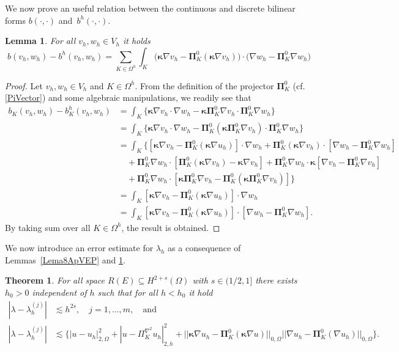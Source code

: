 \documentclass[final,reqno]{elsarticle}
\newtheorem{lemma}{Lemma}[section]
\newtheorem{theorem}{Theorem}[section]
\def\l{\lambda}
\def\bkappa{\boldsymbol{\kappa}}
\def\bPi{\mathbf{\Pi}}
\begin{document}
We now prove an useful relation between the continuous and discrete bilinear forms $b(\cdot,\cdot)$ and~$b^h(\cdot,\cdot)$.
\begin{lemma}\label{LemAuxiliar}
    For all $v_h,w_h\in V_h$ it holds
    \begin{equation*}
        b(v_h,w_h)-b^h(v_h,w_h)=\sum\limits_{K\in \Omega^h} \int_K \Big(\bkappa \nabla v_h-\bPi_K^0(\bkappa \nabla v_h) \Big)\cdot\Big( \nabla w_h - \bPi_K^0 \nabla w_h \Big) 
    \end{equation*}
\end{lemma}
\begin{proof}
Let  $v_h,w_h\in V_h$ and  $K\in \Omega^h$. From the definition of the projector $\bPi_K^0$ (cf. \eqref{PiVector}) and some algebraic manipulations, we readily see that
\begin{align*}
b_K(v_h,w_h)-b_K^h(v_h,w_h)
& =\int_K  \Big\{ \bkappa \nabla v_h\cdot \nabla w_h - \bkappa \bPi_K^0 \nabla v_h \cdot \bPi_K^0 \nabla w_h  \Big\}  \\
&=\int_K  \Big\{ \bkappa \nabla v_h\cdot \nabla w_h - \bPi_K^0(\bkappa \bPi_K^0 \nabla v_h) \cdot  \bPi_K^0 \nabla w_h  \Big\}\nonumber\\
&=\int_K \Big\{ [\bkappa \nabla v_h - \bPi_K^0(\bkappa \nabla u_h) ]\cdot \nabla w_h + \bPi_K^0(\bkappa \nabla v_h )\cdot [\nabla w_h-\bPi_K^0 \nabla w_h]\nonumber\\
&\quad + \bPi_K^0 \nabla w_h\cdot [\bPi_K^0(\bkappa \nabla v_h)- \bkappa \nabla v_h] + \bPi_K^0 \nabla w_h\cdot \bkappa[ \nabla v_h- \bPi_K^0 \nabla v_h] \\
&\quad + \bPi_K^0 \nabla w_h\cdot[\bkappa \bPi_K^0 \nabla v_h - \bPi_K^0(\bkappa \bPi_K^0 \nabla v_h) ] 
\Big\} \nonumber\\
&= \int_K  [\bkappa \nabla v_h - \bPi_K^0(\bkappa \nabla u_h) ]\cdot \nabla w_h\\
&= \int_K  [\bkappa \nabla v_h - \bPi_K^0(\bkappa \nabla u_h) ]\cdot [\nabla w_h -\bPi_K^0 \nabla w_h]\nonumber.
 \end{align*}
By taking sum over all $K\in \Omega^h$, the result is obtained.
\end{proof}
We now introduce an error estimate for $\lambda_h$ as a consequence of Lemmas~\ref{Lema8ApVEP} and \ref{LemAuxiliar}.
\begin{theorem}\label{th:convergenceRates}
For all space $R(E)\subseteq H^{2+s}(\Omega)$ with $s \in (1/2,1]$ there exists $h_0>0$ independent of $h$ such that for all $h<h_0$ it hold
\begin{align}
    \left|\l-\l_h^{(j)}\right|&\lesssim  h^{2s},\quad j=1,\ldots,m, \quad \text{and} \nonumber\\
    |\lambda - \lambda_h^{(j)}|&\lesssim \Bigg\{|u-u_h|_{2,\Omega}^2+|u-\Pi_K^{\nabla^2} u_h|_{2,h}^2 +||\bkappa \nabla u_h - \bPi_K^0(\bkappa \nabla u)   ||_{0,\Omega} ||\nabla u_h -\bPi_K^0( \nabla u_h)  ||_{0,\Omega} \Bigg\}.\nonumber
\end{align}
\end{theorem}
\end{document}

